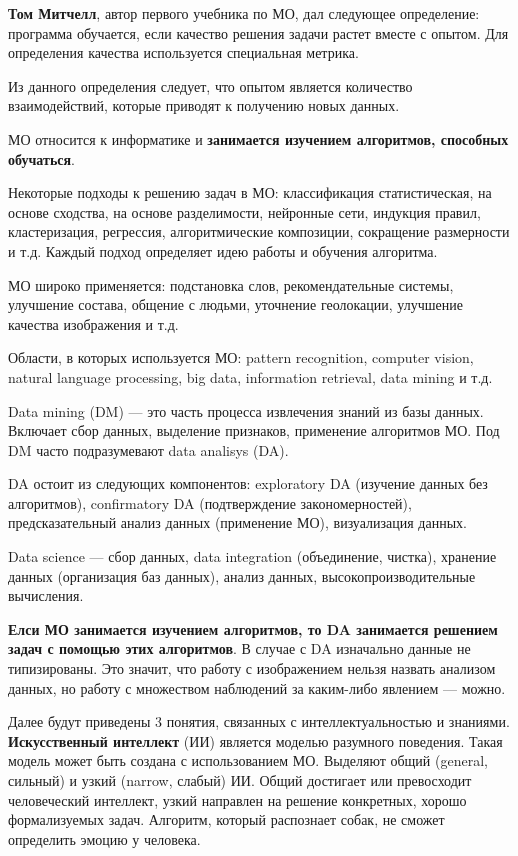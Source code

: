 \textbf{Том Митчелл}, автор первого учебника по МО, дал следующее определение:
программа обучается, если качество решения задачи растет вместе с опытом. Для
определения качества используется специальная метрика.

Из данного определения следует, что опытом является количество взаимодействий,
которые приводят к получению новых данных.

МО относится к информатике и \textbf{занимается изучением алгоритмов,
способных обучаться}.

Некоторые подходы к решению задач в МО: классификация статистическая, на
основе сходства, на основе разделимости, нейронные сети, индукция правил,
кластеризация, регрессия, алгоритмические композиции, сокращение размерности
и т.д. Каждый подход определяет идею работы и обучения алгоритма.

МО широко применяется: подстановка слов, рекомендательные системы, улучшение
состава, общение с людьми, уточнение геолокации, улучшение качества изображения
и т.д.

Области, в которых используется МО: pattern recognition, computer vision,
natural language processing, big data, information retrieval, data mining и
т.д.

Data mining (DM) --- это часть процесса извлечения знаний из базы данных.
Включает сбор данных, выделение признаков, применение алгоритмов МО. Под DM
часто подразумевают data analisys (DA).

DA остоит из следующих компонентов: exploratory DA (изучение данных без
алгоритмов), confirmatory DA (подтверждение закономерностей), предсказательный
анализ данных (применение МО), визуализация данных.

Data science --- сбор данных, data integration (объединение, чистка), хранение
данных (организация баз данных), анализ данных, высокопроизводительные
вычисления.

\textbf{Елси МО занимается изучением алгоритмов, то DA занимается решением
задач с помощью этих алгоритмов}. В случае с DA изначально данные не
типизированы. Это значит, что работу с изображением нельзя назвать анализом
данных, но работу с множеством наблюдений за каким-либо явлением --- можно.

Далее будут приведены 3 понятия, связанных с интеллектуальностью и знаниями.
\textbf{Искусственный интеллект} (ИИ) является моделью разумного поведения.
Такая модель может быть создана с использованием МО. Выделяют общий (general,
сильный) и узкий (narrow, слабый) ИИ. Общий достигает или превосходит
человеческий интеллект, узкий направлен на решение конкретных, хорошо
формализуемых задач. Алгоритм, который распознает собак, не сможет определить
эмоцию у человека.

